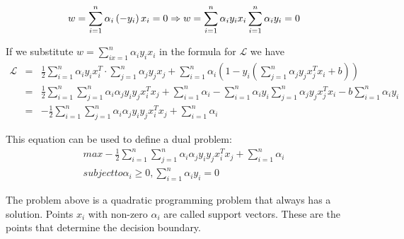 \begin{equation}
w = \sum_{i=1}^{n}\alpha_i\left(-y_i\right)x_i=0 \Rightarrow w = \sum_{i=1}^{n}\alpha_i y_i x_i \\
\sum_{i=1}^{n}\alpha_i y_i=0
\end{equation}

If we substitute $w=\sum_{ix=1}^{n}\alpha_i y_i x_i$ in the formula for $\mathcal{L}$ we have
\begin{eqnarray*}
\mathcal{L} & = &\frac{1}{2}\sum_{i=1}^{n}\alpha_iy_ix_i^T \cdot \sum_{j=1}^{n}\alpha_jy_jx_j+\sum_{i=1}^{n}\alpha_i\left(1-y_i\left(\sum_{j=1}^{n}\alpha_jy_jx_j^Tx_i+b\right)\right) \\
& = &\frac{1}{2}\sum_{i=1}^{n}\sum_{j=1}^{n}\alpha_i\alpha_j y_i y_j x_i^T x_j + \sum_{i=1}^{n}\alpha_i-\sum_{i=1}^{n}\alpha_i y_i \sum_{j=1}^{n}\alpha_j y_j x_j^T x_i -b\sum_{i=1}^{n}\alpha_i y_i \\
& = &-\frac{1}{2}\sum_{i=1}^{n}\sum_{j=1}^{n}\alpha_i\alpha_j y_i y_j x_i^T x_j + \sum_{i=1}^{n}\alpha_i
\end{eqnarray*}

This equation can be used to define a dual problem:
\begin{eqnarray*}\label{eq:svm_dual}
max -\frac{1}{2}\sum_{i=1}^{n}\sum_{j=1}^{n}\alpha_i\alpha_j y_i y_j x_i^T x_j + \sum_{i=1}^{n}\alpha_i \\
subject to \alpha_i \ge 0, \sum_{i=1}^{n} \alpha_iy_i =0
\end{eqnarray*}

The problem above is a quadratic programming problem that always has a solution. Points $x_i$ with non-zero $\alpha_i$ are called support vectors. These are the points that determine the decision boundary.

